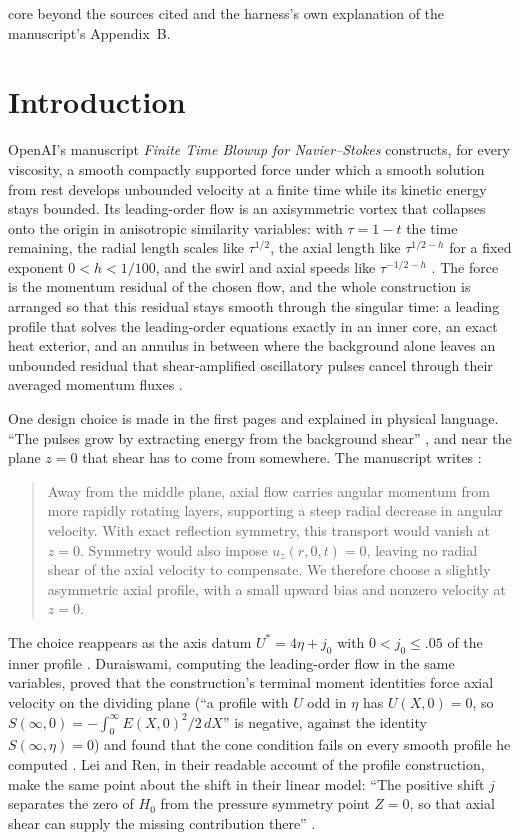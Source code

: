 \documentclass[11pt]{article}
\begin{document}
\begin{attribution}
core beyond the sources cited and the harness's own explanation of the manuscript's Appendix~B.
\end{attribution}

\section{Introduction}\label{sec:intro}

OpenAI's manuscript \emph{Finite Time Blowup for Navier--Stokes} \cite{OpenAINS} constructs, for every viscosity, a smooth compactly supported force under which a smooth solution from rest develops unbounded velocity at a finite time while its kinetic energy stays bounded. Its leading-order flow is an axisymmetric vortex that collapses onto the origin in anisotropic similarity variables: with $\tau=1-t$ the time remaining, the radial length scales like $\tau^{1/2}$, the axial length like $\tau^{1/2-h}$ for a fixed exponent $0<h<1/100$, and the swirl and axial speeds like $\tau^{-1/2-h}$ \cite[pp.~4--5]{OpenAINS}. The force is the momentum residual of the chosen flow, and the whole construction is arranged so that this residual stays smooth through the singular time: a leading profile that solves the leading-order equations exactly in an inner core, an exact heat exterior, and an annulus in between where the background alone leaves an unbounded residual that shear-amplified oscillatory pulses cancel through their averaged momentum fluxes \cite[Sections 2--3]{OpenAINS}.

One design choice is made in the first pages and explained in physical language. ``The pulses grow by extracting energy from the background shear'' \cite[p.~6]{OpenAINS}, and near the plane $z=0$ that shear has to come from somewhere. The manuscript writes \cite[p.~5]{OpenAINS}:
\begin{quote}
Away from the middle plane, axial flow carries angular momentum from more rapidly rotating layers, supporting a steep radial decrease in angular velocity. With exact reflection symmetry, this transport would vanish at $z=0$. Symmetry would also impose $u_z(r,0,t)=0$, leaving no radial shear of the axial velocity to compensate. We therefore choose a slightly asymmetric axial profile, with a small upward bias and nonzero velocity at $z=0$.
\end{quote}
The choice reappears as the axis datum $U^*=4\eta+j_0$ with $0<j_0\le .05$ of the inner profile \cite[(B.1), p.~144]{OpenAINS}. Duraiswami, computing the leading-order flow in the same variables, proved that the construction's terminal moment identities force axial velocity on the dividing plane (``a profile with $U$ odd in $\eta$ has $U(X,0)=0$, so $S(\infty,0)=-\int_0^\infty E(X,0)^2/2\,dX$'' is negative, against the identity $S(\infty,\eta)=0$) and found that the cone condition fails on every smooth profile he computed \cite[pp.~20--22]{Duraiswami}. Lei and Ren, in their readable account of the profile construction, make the same point about the shift in their linear model: ``The positive shift $j$ separates the zero of $H_0$ from the pressure symmetry point $Z=0$, so that axial shear can supply the missing contribution there'' \cite[pp.~107--109]{LeiRen}.
\end{document}
